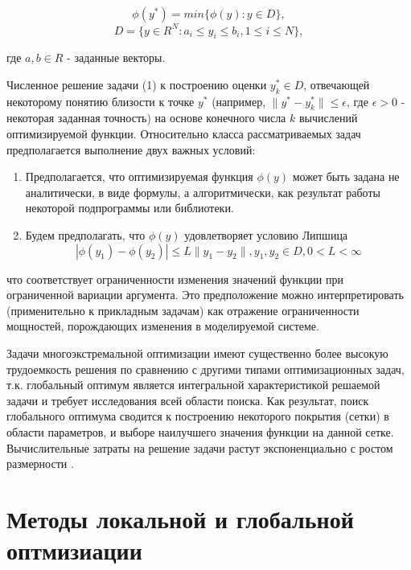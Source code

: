 \documentclass[11pt, oneside, a4paper]{article}
\begin{document}
\begin{equation*}   %
\phi(y^*) = min\{\phi(y):y\in D\},
\end{equation*}
\begin{equation}   %
D = \{y \in R^N : a_i \leq y_i \leq b_i,
1 \leq i \leq N \},
\end{equation}

где $a,b \in R$ - заданные векторы.


Численное решение задачи (1) к построению оценки $y_k^* \in D$, отвечающей некоторому понятию близости к точке $y^*$ (например, $\parallel y^*-y_k^* \parallel \leq \epsilon$, где $\epsilon>0$ - некоторая заданная точность) на основе конечного числа $k$ вычислений оптимизируемой функции. Относительно класса рассматриваемых задач предполагается выполнение двух важных условий:
\begin{enumerate}
\item Предполагается, что оптимизируемая функция $\phi(y)$ может быть задана не аналитически, в виде формулы, а алгоритмически, как результат работы некоторой подпрограммы или библиотеки.

\item Будем предполагать, что $\phi(y)$ удовлетворяет условию Липшица
\begin{equation}
|\phi(y_1)-\phi(y_2)|\leq L\parallel y_1-y_2 \parallel
,y_1,y_2 \in D, 0<L< \infty
\end{equation}
\end{enumerate}
что соответствует ограниченности изменения значений функции при ограниченной вариации аргумента. Это предположение можно интерпретировать (применительно к прикладным задачам) как отражение ограниченности мощностей, порождающих изменения в моделируемой системе.

Задачи многоэкстремальной оптимизации имеют существенно более высокую трудоемкость решения по сравнению с другими типами оптимизационных задач, т.к. глобальный оптимум является интегральной характеристикой решаемой задачи и требует исследования всей области поиска. Как результат, поиск глобального оптимума сводится к построению некоторого покрытия (сетки) в области параметров, и выборе наилучшего значения функции на данной сетке. Вычислительные затраты на решение задачи растут экспоненциально с ростом размерности \cite{fio_bib7}.


\section{Методы локальной и глобальной оптмизиации}
\end{document}
